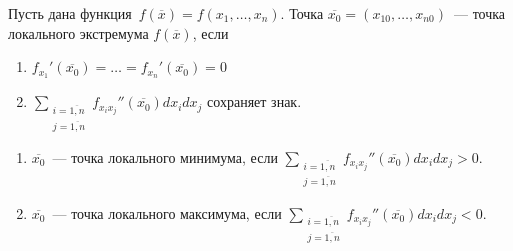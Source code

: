 \begin{theorem}
\label{th:sufficient_condition_of_local_extremum}
Пусть дана функция~$f(\overline x) = f(x_1, \ldots, x_n)$.
Точка $\overline{x_0} = (x_{10}, \ldots, x_{n0})$~--- точка локального экстремума $f(\overline x)$, если
\begin{enumerate}
	\item $\displaystyle f_{x_1}'(\overline{x_0}) = \ldots = f_{x_n}'(\overline{x_0}) = 0$
	\item $\displaystyle \sum_{
	\begin{smallmatrix}
	i = \overline{1, n} \\
	j = \overline{1, n}
	\end{smallmatrix}
	} f_{x_i x_j}''(\overline{x_0}) dx_i dx_j$ сохраняет знак.
\end{enumerate}

\begin{enumerate}
	\item $\overline{x_0}$~--- точка локального минимума, если $\displaystyle \sum_{
	\begin{smallmatrix}
	i = \overline{1, n} \\
	j = \overline{1, n}
	\end{smallmatrix}
	} f_{x_i x_j}''(\overline{x_0}) dx_i dx_j > 0$.
	\item $\overline{x_0}$~--- точка локального максимума, если $\displaystyle \sum_{
	\begin{smallmatrix}
	i = \overline{1, n} \\
	j = \overline{1, n}
	\end{smallmatrix}
	} f_{x_i x_j}''(\overline{x_0}) dx_i dx_j < 0$.
\end{enumerate}
\end{theorem}
